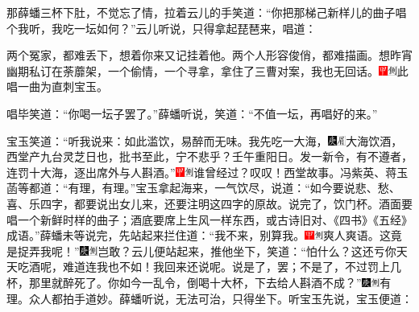 那薛蟠三杯下肚，不觉忘了情，拉着云儿的手笑道：“你把那梯己新样儿的曲子唱个我听，我吃一坛如何？”云儿听说，只得拿起琵琶来，唱道：

两个冤家，都难丢下，想着你来又记挂着他。两个人形容俊俏，都难描画。想昨宵幽期私订在荼蘼架，一个偷情，一个寻拿，拿住了三曹对案，我也无回话。{\includegraphics[width=3mm]{../Images/00002}\includegraphics[width=3mm]{../Images/00011}\footnotesize \kaishu 此唱一曲为直刺宝玉。}

唱毕笑道：“你喝一坛子罢了。”薛蟠听说，笑道：“不值一坛，再唱好的来。”

宝玉笑道：“听我说来：如此滥饮，易醉而无味。我先吃一大海，{\includegraphics[width=3mm]{../Images/00004}\includegraphics[width=3mm]{../Images/00010}\footnotesize \kaishu 大海饮酒，西堂产九台灵芝日也，批书至此，宁不悲乎？壬午重阳日。}发一新令，有不遵者，连罚十大海，逐出席外与人斟酒。”{\includegraphics[width=3mm]{../Images/00002}\includegraphics[width=3mm]{../Images/00011}\footnotesize \kaishu 谁曾经过？叹叹！西堂故事。}冯紫英、蒋玉菡等都道：“有理，有理。”宝玉拿起海来，一气饮尽，说道：“如今要说悲、愁、喜、乐四字，都要说出女儿来，还要注明这四字的原故。说完了，饮门杯。酒面要唱一个新鲜时样的曲子；酒底要席上生风一样东西，或古诗旧对、《四书》《五经》成语。”薛蟠未等说完，先站起来拦住道：“我不来，别算我。{\includegraphics[width=3mm]{../Images/00002}\includegraphics[width=3mm]{../Images/00011}\footnotesize \kaishu 爽人爽语。}这竟是捉弄我呢！”{\includegraphics[width=3mm]{../Images/00004}\includegraphics[width=3mm]{../Images/00011}\footnotesize \kaishu 岂敢？}云儿便站起来，推他坐下，笑道：“怕什么？这还亏你天天吃酒呢，难道连我也不如！我回来还说呢。说是了，罢；不是了，不过罚上几杯，那里就醉死了。你如今一乱令，倒喝十大杯，下去给人斟酒不成？”{\includegraphics[width=3mm]{../Images/00004}\includegraphics[width=3mm]{../Images/00011}\footnotesize \kaishu 有理。}众人都拍手道妙。薛蟠听说，无法可治，只得坐下。听宝玉先说，宝玉便道：


